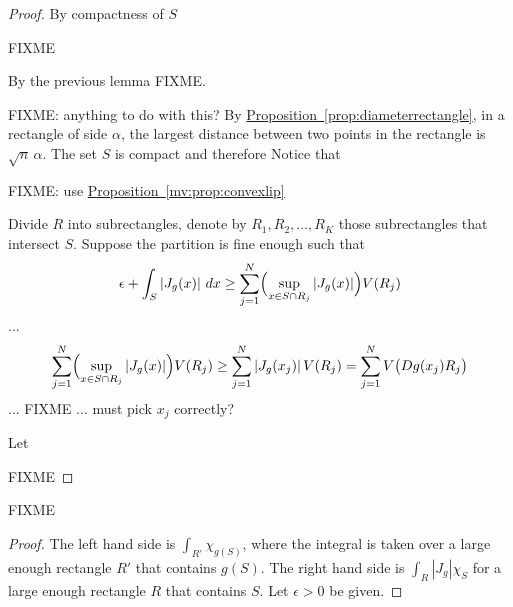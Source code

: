 \documentclass[12pt]{book}
\newcommand{\abs}[1]{\left\lvert {#1} \right\rvert}
\newcommand{\R}{{\mathbb{R}}}
\theoremstyle{plain}
\newtheorem{lemma}[thm]{Lemma}
\theoremstyle{remark}
\theoremstyle{definition}
\theoremstyle{exercise}
\theoremstyle{example}
\newcommand{\propref}[1]{\hyperref[#1]{Proposition~\ref*{#1}}}
\begin{document}
{\begin{proof}
By compactness of $S$

FIXME

By the previous lemma FIXME.




FIXME: anything to do with this?
By \propref{prop:diameterrectangle},
in a rectangle of side $\alpha$, the largest distance 
between two points in the rectangle is $\sqrt{n} \, \alpha$.
The set $S$ is compact and therefore 
Notice that 

FIXME: use
\propref{mv:prop:convexlip}





Divide $R$ into
subrectangles, denote
by $R_1,R_2,\ldots,R_K$ those subrectangles that intersect $S$.
Suppose the partition is fine enough such that
\begin{equation*}
\epsilon + \int_S \abs{J_g(x)} \, dx \geq
\sum_{j=1}^N \Bigl(\sup_{x \in S \cap R_j} \abs{J_g(x)} \Bigr) V(R_j)
\end{equation*}
...
\begin{equation*}
\sum_{j=1}^N \Bigl(\sup_{x \in S \cap R_j} \abs{J_g(x)} \Bigr) V(R_j)
\geq
\sum_{j=1}^N \abs{J_g(x_j)}  V(R_j)
=
\sum_{j=1}^N V\bigl(Dg(x_j) R_j\bigr)
\end{equation*}
... FIXME ... must pick $x_j$ correctly?




Let 






FIXME
\end{proof}


FIXME

\begin{proof}
The left hand side is $\int_{R'} \chi_{g(S)}$, where the integral is taken over a
large enough rectangle $R'$ that contains $g(S)$.
The right hand side is $\int_{R} \abs{J_g} \chi_S$ for
a large enough rectangle $R$ that contains $S$.  Let $\epsilon > 0$ be
given.


\end{proof}}
\end{document}
